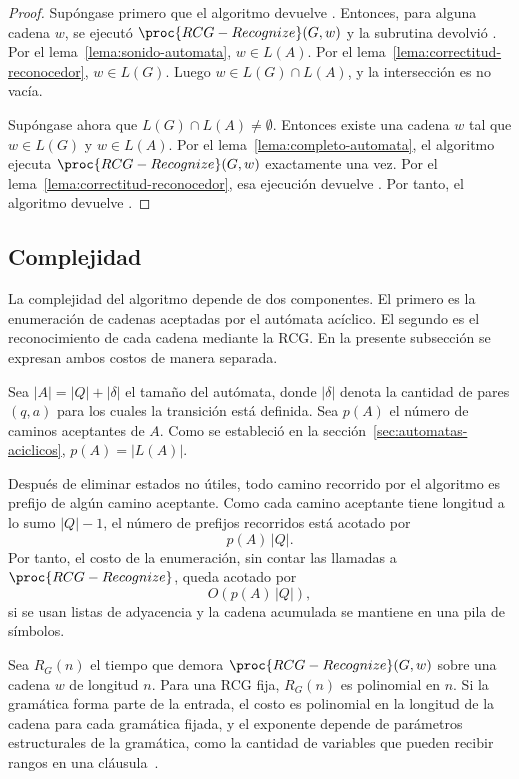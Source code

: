 \documentclass{report}
\theoremstyle{definition}
\theoremstyle{plain}
\theoremstyle{remark}
\begin{document}
\begin{proof}
  Supóngase primero que el algoritmo devuelve . Entonces, para
  alguna cadena $w$, se ejecutó $\proc{RCG-Recognize}(G,w)$ y la subrutina
  devolvió . Por el lema~\ref{lema:sonido-automata},
  $w \in L(A)$. Por el lema~\ref{lema:correctitud-reconocedor},
  $w \in L(G)$. Luego $w \in L(G) \cap L(A)$, y la intersección es no
  vacía.

  Supóngase ahora que $L(G) \cap L(A) \neq \emptyset$. Entonces existe una
  cadena $w$ tal que $w \in L(G)$ y $w \in L(A)$. Por el
  lema~\ref{lema:completo-automata}, el algoritmo ejecuta
  $\proc{RCG-Recognize}(G,w)$ exactamente una vez. Por el
  lema~\ref{lema:correctitud-reconocedor}, esa ejecución devuelve
  . Por tanto, el algoritmo devuelve .
\end{proof}

\subsection{Complejidad}
\label{sec:complejidad-algoritmo}

La complejidad del algoritmo depende de dos componentes. El primero es
la enumeración de cadenas aceptadas por el autómata acíclico. El
segundo es el reconocimiento de cada cadena mediante
la RCG. En la presente subsección se expresan ambos costos de manera
separada.

Sea $|A|=|Q|+|\delta|$ el tamaño del autómata, donde $|\delta|$ denota
la cantidad de pares $(q,a)$ para los cuales la transición está definida.
Sea $p(A)$ el número de caminos aceptantes de $A$. Como se estableció
en la sección~\ref{sec:automatas-aciclicos}, $p(A)=|L(A)|$.

Después de eliminar estados no útiles, todo camino recorrido por el
algoritmo es prefijo de algún camino aceptante. Como cada camino
aceptante tiene longitud a lo sumo $|Q|-1$, el número de prefijos
recorridos está acotado por
\[
  p(A)\,|Q|.
\]
Por tanto, el costo de la enumeración, sin contar las llamadas a
$\proc{RCG-Recognize}$, queda acotado por
\[
  O(p(A)\,|Q|),
\]
si se usan listas de adyacencia y la cadena acumulada se mantiene en
una pila de símbolos.

Sea $R_G(n)$ el tiempo que demora
$\proc{RCG-Recognize}(G,w)$ sobre una cadena $w$ de longitud $n$. Para
una RCG fija, $R_G(n)$ es polinomial en $n$. Si la gramática forma parte
de la entrada, el costo es polinomial en la longitud de la cadena para
cada gramática fijada, y el exponente depende de parámetros
estructurales de la gramática, como la cantidad de variables que pueden
recibir rangos en una cláusula~\cite{bertsch2001rcg,kallmeyer2010parsing}.
\end{document}
